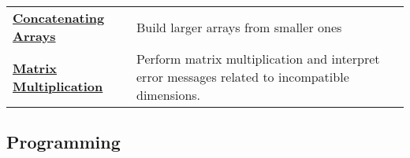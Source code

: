\documentclass[11pt]{article}
\begin{document}
\begin{longtable}[]{@{}ll@{}}
\begin{minipage}[t]{0.29\columnwidth}\raggedright\strut
\textbf{\href{http://youtu.be/TgopxS-_zl8}{Concatenating Arrays}}\strut
\end{minipage} & \begin{minipage}[t]{0.29\columnwidth}\raggedright\strut
Build larger arrays from smaller ones\strut
\end{minipage}\tabularnewline
\begin{minipage}[t]{0.29\columnwidth}\raggedright\strut
\textbf{\href{http://youtu.be/-jgXqAYBhxI}{Matrix Multiplication}}\strut
\end{minipage} & \begin{minipage}[t]{0.29\columnwidth}\raggedright\strut
Perform matrix multiplication and interpret error messages related to
incompatible dimensions.\strut
\end{minipage}\tabularnewline
\bottomrule
\end{longtable}

\subsection{Programming}\label{programming}
\end{document}
